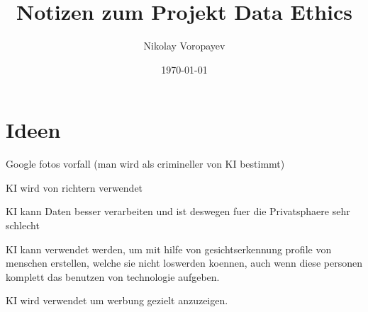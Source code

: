 \documentclass{article}
\title{Notizen zum Projekt Data Ethics}
\author{Nikolay Voropayev}
\date{\today}
\begin{document}
\maketitle


\tableofcontents

\section{Ideen}
Google fotos vorfall (man wird als crimineller von KI bestimmt)

KI wird von richtern verwendet

KI kann Daten besser verarbeiten und ist deswegen fuer die Privatsphaere sehr schlecht

KI kann verwendet werden, um mit hilfe von gesichtserkennung profile von menschen erstellen, welche sie nicht loswerden koennen, auch wenn diese personen komplett das benutzen von technologie aufgeben.

KI wird verwendet um werbung gezielt anzuzeigen.



\printbibliography
\end{document}
